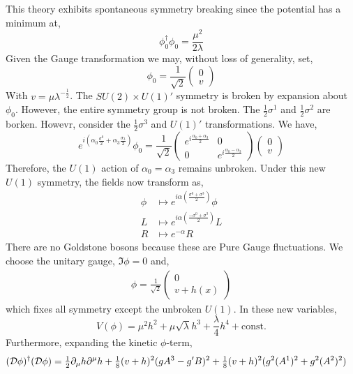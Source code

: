 \documentclass[12pt]{extarticle}
\begin{document}
This theory exhibits spontaneous symmetry breaking since the potential has a minimum at,
\[ \phi^\dagger_0 \phi_0 = \frac{\mu^2}{2 \lambda} \]
Given the Gauge transformation we may, without loss of generality, set,
\[ \phi_0 = \frac{1}{\sqrt{2}} 
\begin{pmatrix}
0 
\\
v
\end{pmatrix} \]
With $v = \mu \lambda^{-\frac{1}{2}}$. The $SU(2) \times U(1)'$ symmetry is broken by expansion about $\phi_0$. However, the entire symmetry group is not broken. The $\frac{1}{2} \sigma^1$ and $\frac{1}{2} \sigma^2$ are borken. Howevr, consider the $\frac{1}{2} \sigma^3$ and $U(1)'$ transformations. We have,
\[ e^{i(\alpha_0 \frac{\sigma^0}{2} + \alpha_3 \frac{\sigma_3}{2})} \phi_0 = \frac{1}{\sqrt{2}}
\begin{pmatrix}
e^{i \frac{\alpha_0 + \alpha_3}{2}} & 0
\\
0 & e^{i \frac{\alpha_0 - \alpha_3}{2}} 
\end{pmatrix}
\begin{pmatrix}
0
\\
v
\end{pmatrix} \]
Therefore, the $U(1)$ action of $\alpha_0 = \alpha_3$ remains unbroken. Under this new $U(1)$ symmetry, the fields now transform as,
\begin{align*}
\phi & \mapsto e^{i \alpha \left( \frac{\sigma^0 + \sigma^3}{2} \right)} \phi
\\
L & \mapsto e^{i \alpha \left( \frac{-\sigma^0 + \sigma^3}{2} \right)} L
\\
R & \mapsto e^{- \alpha} R
\end{align*}
There are no Goldstone bosons because these are Pure Gauge fluctuations. We choose the unitary gauge, $\Im{\phi} = 0$ and,
\begin{align*}
\phi = \frac{1}{\sqrt{2}}
\begin{pmatrix}
0
\\
v + h(x)
\end{pmatrix}
\end{align*}
which fixes all symmetry except the unbroken $U(1)$. In these new variables,
\[ V(\phi) = \mu^2 h^2 + \mu \sqrt{\lambda} h^3 + \frac{\lambda}{4} h^4 + \text{const.} \]
Furthermore, expanding the kinetic $\phi$-term,
\begin{align*}
(\mathcal{D} \phi)^\dagger (\mathcal{D} \phi) & = \tfrac{1}{2} \partial_\mu h \partial^\mu h + \tfrac{1}{8} (v + h)^2 (g A^3  - g' B)^2 + \tfrac{1}{8} (v + h)^2 (g^2 (A^1)^2 + g^2 (A^2)^2)
\end{align*}
\end{document}
